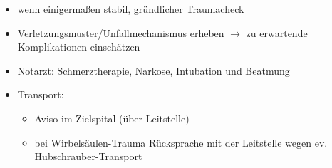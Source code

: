 {\begin{itemize}
\begin{itemize}
        	\item Atem- und Kreislaufstillstand $\rightarrow$ Rückenlage
			\item Bewusstlosigkeit, nicht intubiert $\rightarrow$ stabile Seitenlage (bei Thorax- und/oder Extremitätentrauma auf verletzte Seite legen)
			\item Atemnot bei Thoraxtrauma $\rightarrow$ Oberkörper hoch (45°)
			\item Abdominaltrauma $\rightarrow$ Schonhaltung, Knierolle
			\item SHT $\rightarrow$ Oberkörper hoch (30°)
			\item Wirbelsäulentrauma $\rightarrow$ Flachlagerung auf Vakuummatratze
			\item Extremitätentrauma $\rightarrow$ Extremität schienen und fixieren
			\item Schock $\rightarrow$ Schocklagerung durch schräg stellen des Tragentisches
			\end{itemize} 
        \item wenn einigerma{\ss}en stabil, gr\"undlicher  Traumacheck
        \item Verletzungsmuster/Unfallmechanismus erheben $\rightarrow$ zu erwartende Komplikationen einschätzen
        \item Notarzt: Schmerztherapie, Narkose, Intubation und Beatmung
        \item Transport:
        	\begin{itemize}
			\item Aviso im Zielspital (über Leitstelle)
			\item bei Wirbelsäulen-Trauma Rücksprache mit der Leitstelle wegen ev. Hubschrauber-Transport
			\end{itemize}
    \end{itemize}
}




